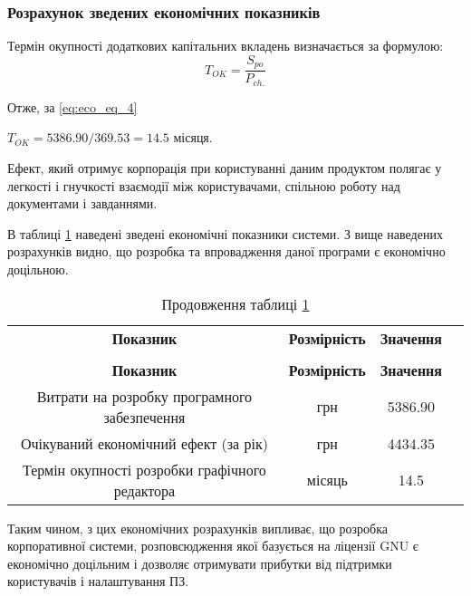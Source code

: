 \subsubsection{Розрахунок зведених економічних показників}
\par Термін   окупності   додаткових   капітальних   вкладень   визначається   за формулою:
\begin{equation}\label{eq:eco_eq_4}
	T_{OK} = \frac{S_{po}}{P_{ch.}}
\end{equation}
\par Отже, за \eqref{eq:eco_eq_4}
\begin{center}
	$T_{OK}=5386.90/369.53=14.5$ місяця.
\end{center}

\par Ефект, який отримує корпорація при користуванні даним продуктом полягає у легкості і гнучкості взаємодії між користувачами, спільною роботу над документами і завданнями.
\par В таблиці \ref{t:eco_4} наведені зведені економічні показники системи. З вище наведених розрахунків видно, що розробка та впровадження даної програми є економічно доцільною. 


\begin{center}\footnotesize
\begin{longtable}{|c|c|c|c|}

\captionsetup{justification=centering}
\caption{Зведені економічні показники розробки системи}\label{t:eco_4}\\
\hline
\multicolumn{1}{|c|}{\textbf{Показник}}&
\multicolumn{1}{c|}{\textbf{Розмірність}}&
\multicolumn{1}{c|}{\textbf{Значення}}\\\hline

\endfirsthead
\caption*{\hfill Продовження таблиці \ref{t:eco_4}}\\\hline

\multicolumn{1}{|c|}{\textbf{Показник}}&
\multicolumn{1}{c|}{\textbf{Розмірність}}&
\multicolumn{1}{c|}{\textbf{Значення}}\\\hline
\endhead

Витрати на розробку програмного забезпечення & грн & 5386.90 \\ \hline
Очікуваний економічний ефект (за рік) & грн & 4434.35 \\ \hline
Термін окупності розробки графічного редактора & місяць & 14.5 \\ \hline

\end{longtable}
\end{center}

\par Таким чином, з цих економічних розрахунків випливає, що розробка корпоративної системи, розповсюдження якої базується на ліцензії GNU є економічно доцільним і дозволяє отримувати прибутки від підтримки користувачів і налаштування ПЗ.